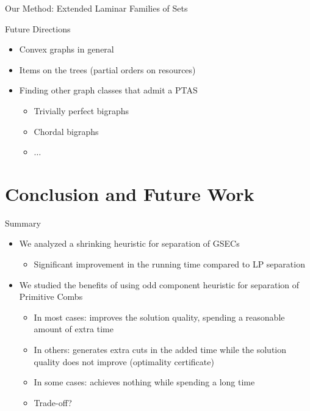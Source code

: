 \documentclass[10pt]{beamer}
\begin{document}
\begin{frame}{Our Method: Extended Laminar Families of Sets}
\end{frame}

\begin{frame}{Future Directions}
	\begin{itemize}
    	\item<1-> Convex graphs in general
        \item<2-> Items on the trees (partial orders on resources)
        \item<3-> Finding other graph classes that admit a PTAS
        	\begin{itemize}
            	\item<4-> Trivially perfect bigraphs
                \item<5-> Chordal bigraphs
                \item<6-> $\ldots$
            \end{itemize}
    \end{itemize}
\end{frame}




\section{Conclusion and Future Work}

\begin{frame}{Summary}
\begin{itemize}
\item<1-> We analyzed a shrinking heuristic for separation of GSECs
	\begin{itemize}
	\item<2-> \alert{Significant improvement} in the running time compared to LP separation
	\end{itemize}
\item<3-> We studied the benefits of using odd component heuristic for separation of Primitive Combs
	\begin{itemize}
	\item<4-> In most cases: \alert{improves} the solution quality, spending a reasonable amount of extra time
	\item<5-> In others: generates extra cuts in the added time while the solution quality does not improve (\alert{optimality certificate})
	\item<6-> In some cases: achieves \alert{nothing} while spending a long time
	\item<7-> Trade-off?
	\end{itemize}
\end{itemize}
\end{frame}
\end{document}
